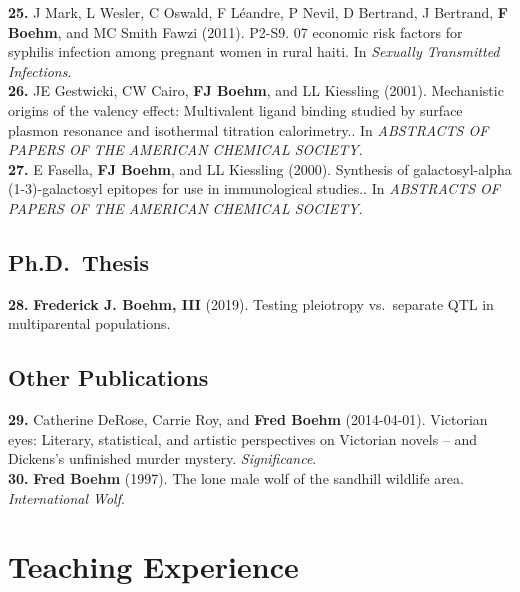 \documentclass[
  10pt,
]
{article}
\begin{document}
\textbf{25.} \normalsize \normalsize J Mark\normalsize , \normalsize L
Wesler\normalsize , \normalsize C Oswald\normalsize , \normalsize F
Léandre\normalsize , \normalsize P Nevil\normalsize , \normalsize D
Bertrand\normalsize , \normalsize J Bertrand\normalsize ,
\textbf{\normalsize F Boehm}\normalsize , and \normalsize MC Smith Fawzi
(2011). P2-S9. 07 economic risk factors for syphilis infection among
pregnant women in rural haiti. In \emph{Sexually Transmitted
Infections}.\\
\textbf{26.} \normalsize \normalsize JE Gestwicki\normalsize ,
\normalsize CW Cairo\normalsize ,
\textbf{\normalsize FJ Boehm}\normalsize , and \normalsize LL Kiessling
(2001). Mechanistic origins of the valency effect: Multivalent ligand
binding studied by surface plasmon resonance and isothermal titration
calorimetry.. In \emph{ABSTRACTS OF PAPERS OF THE AMERICAN CHEMICAL
SOCIETY}.\\
\textbf{27.} \normalsize \normalsize E Fasella\normalsize ,
\textbf{\normalsize FJ Boehm}\normalsize , and \normalsize LL Kiessling
(2000). Synthesis of galactosyl-alpha (1-3)-galactosyl epitopes for use
in immunological studies.. In \emph{ABSTRACTS OF PAPERS OF THE AMERICAN
CHEMICAL SOCIETY}.

\subsection{Ph.D.~Thesis}\label{ph.d.-thesis}

\textbf{28.} \normalsize \textbf{\normalsize Frederick J. Boehm, III}
(2019). Testing pleiotropy vs.~separate QTL in multiparental
populations.

\subsection{Other Publications}\label{other-publications}

\textbf{29.} \normalsize \normalsize Catherine DeRose\normalsize ,
\normalsize Carrie Roy\normalsize , and \textbf{\normalsize Fred Boehm}
(2014-04-01). Victorian eyes: Literary, statistical, and artistic
perspectives on Victorian novels -- and Dickens's unfinished murder
mystery. \emph{Significance}.\\
\textbf{30.} \normalsize \textbf{\normalsize Fred Boehm} (1997). The
lone male wolf of the sandhill wildlife area. \emph{International Wolf}.

\section{Teaching Experience}\label{teaching-experience}
\end{document}
